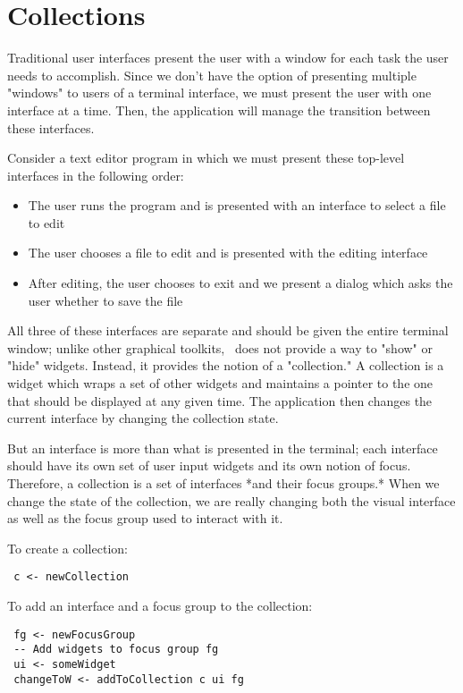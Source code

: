 \section{Collections}

Traditional user interfaces present the user with a window for each task
the user needs to accomplish.  Since we don't have the option of
presenting multiple "windows" to users of a terminal interface, we must
present the user with one interface at a time.  Then, the application
will manage the transition between these interfaces.

Consider a text editor program in which we must present these top-level
interfaces in the following order:

\begin{itemize}
\item The user runs the program and is presented with an interface to
      select a file to edit
\item The user chooses a file to edit and is presented with the
      editing interface
\item After editing, the user chooses to exit and we present a dialog
      which asks the user whether to save the file
\end{itemize}

All three of these interfaces are separate and should be given the
entire terminal window; unlike other graphical toolkits, \vtyui\ does
not provide a way to "show" or "hide" widgets.  Instead, it provides
the notion of a "collection."  A collection is a widget which wraps a
set of other widgets and maintains a pointer to the one that should be
displayed at any given time.  The application then changes the current
interface by changing the collection state.

But an interface is more than what is presented in the terminal; each
interface should have its own set of user input widgets and its own
notion of focus.  Therefore, a collection is a set of interfaces *and
their focus groups.*  When we change the state of the collection, we are
really changing both the visual interface as well as the focus group
used to interact with it.

To create a collection:

\begin{verbatim}
 c <- newCollection
\end{verbatim}

To add an interface and a focus group to the collection:

\begin{verbatim}
 fg <- newFocusGroup
 -- Add widgets to focus group fg
 ui <- someWidget
 changeToW <- addToCollection c ui fg
\end{verbatim}

